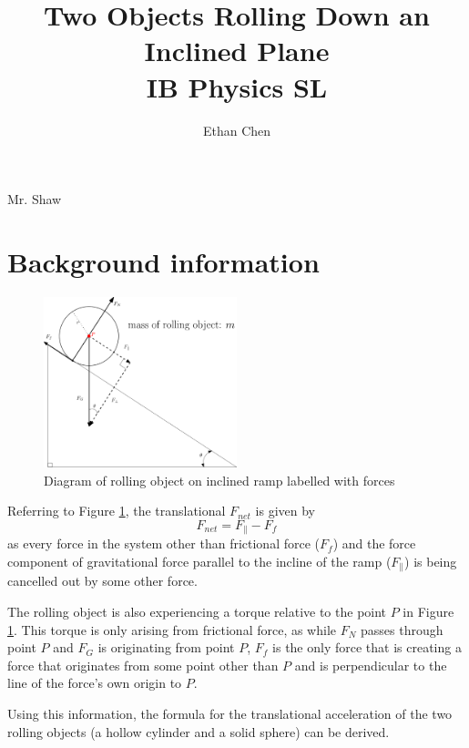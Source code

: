 \documentclass[letterpaper, 12pt]{article}
\title{Two Objects Rolling Down an Inclined Plane \\ IB Physics SL}
\author{Ethan Chen}
\begin{document}
\maketitle

\begin{center}
    Mr. Shaw
\end{center}

\section{Background information}


\begin{figure}[H]
    \centering
    \includegraphics[width=0.5\textwidth]{ramp_incline_labelled}
    \caption{Diagram of rolling object on inclined ramp labelled with forces}
    \label{fig:ramp_labelled}
\end{figure}

Referring to Figure \ref*{fig:ramp_labelled}, the translational $F_{net}$ is given by
$$
    F_{net} = F_{\parallel} - F_f
$$
as every force in the system other than frictional force ($F_f$) and the force component of
gravitational force parallel to the incline of the ramp ($F_{\parallel}$) is being cancelled
out by some other force.

The rolling object is also experiencing a torque relative to the point $P$ in Figure \ref*{fig:ramp_labelled}.
This torque is only arising from frictional force, as while $F_N$ passes through
point $P$ and $F_G$ is originating from point $P$, $F_f$ is the only force that is
creating a force that originates from some point other than $P$ and is perpendicular
to the line of the force's own origin to $P$.

Using this information, the formula for the translational acceleration of the two rolling objects
(a hollow cylinder and a solid sphere) can be derived.
\end{document}
